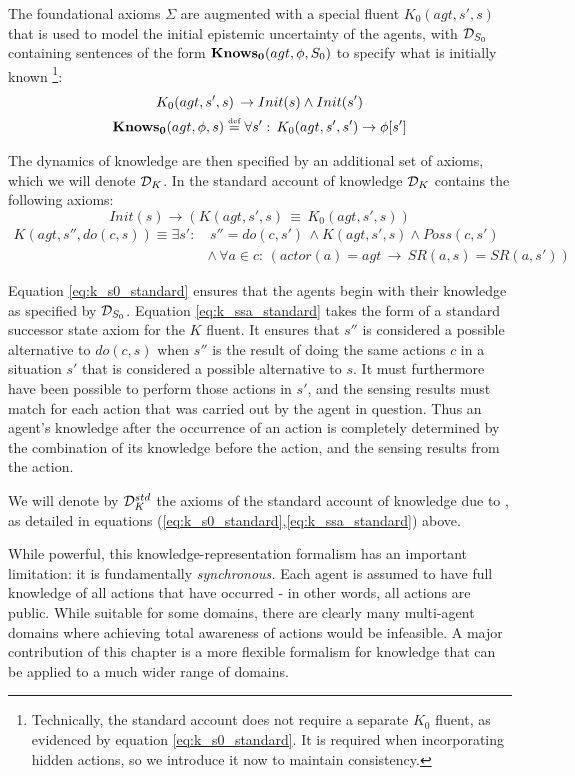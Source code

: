 The foundational axioms $\Sigma$ are augmented with a special fluent
$K_{0}(agt,s',s)$ that is used to model the initial epistemic uncertainty
of the agents, with $\mathcal{D}_{S_{0}}$ containing sentences of the form
$\mathbf{Knows_{0}}(agt,\phi,S_{0})$ to specify what is initially known%
\footnote{Technically, the standard account does not require a separate $K_{0}$
fluent, as evidenced by equation \eqref{eq:k_s0_standard}. It is
required when incorporating hidden actions, so we introduce it now
to maintain consistency. %
}:\begin{gather*}
K_{0}(agt,s',s)\,\rightarrow Init(s)\wedge Init(s')\\
\mathbf{Knows_{0}}(agt,\phi,s)\stackrel{\mbox{\tiny def}}{=}\forall s':\, K_{0}(agt,s',s')\rightarrow\phi[s']\end{gather*}


The dynamics of knowledge are then specified by an additional set
of axioms, which we will denote $\mathcal{D}_{K}$. In the standard account
of knowledge $\mathcal{D}_{K}$ contains the following axioms:\begin{equation}
Init(s)\rightarrow\left(K(agt,s',s)\,\equiv\, K_{0}(agt,s',s)\right)\label{eq:k_s0_standard}\end{equation}
 \begin{align}
K(agt,s'',do(c,s))\equiv\exists s': & \, s''=do(c,s')\,\wedge K(agt,s',s)\wedge Poss(c,s')\nonumber \\
 & \wedge\,\forall a\in c:\,\left(actor(a)=agt\,\rightarrow\, SR(a,s)=SR(a,s')\right)\label{eq:k_ssa_standard}\end{align}


Equation \eqref{eq:k_s0_standard} ensures that the agents begin with
their knowledge as specified by $\mathcal{D}_{S_{0}}$. Equation \eqref{eq:k_ssa_standard}
takes the form of a standard successor state axiom for the $K$ fluent.
It ensures that $s''$ is considered a possible alternative to $do(c,s)$
when $s''$ is the result of doing the same actions $c$ in a situation
$s'$ that is considered a possible alternative to $s$. It must furthermore
have been possible to perform those actions in $s'$, and the sensing
results must match for each action that was carried out by the agent
in question. Thus an agent's knowledge after the occurrence of an
action is completely determined by the combination of its knowledge
before the action, and the sensing results from the action.

\medskip{}


\begin{defn}
We will denote by $\mathcal{D}_{K}^{std}$ the axioms of the standard account
of knowledge due to \citet{scherl03sc_knowledge}, as detailed in
equations (\ref{eq:k_s0_standard},\ref{eq:k_ssa_standard}) above. 
\end{defn}
While powerful, this knowledge-representation formalism has an important
limitation: it is fundamentally \emph{synchronous.} Each agent is
assumed to have full knowledge of all actions that have occurred -
in other words, all actions are public. While suitable for some domains,
there are clearly many multi-agent domains where achieving total awareness
of actions would be infeasible. A major contribution of this chapter
is a more flexible formalism for knowledge that can be applied to
a much wider range of domains.

